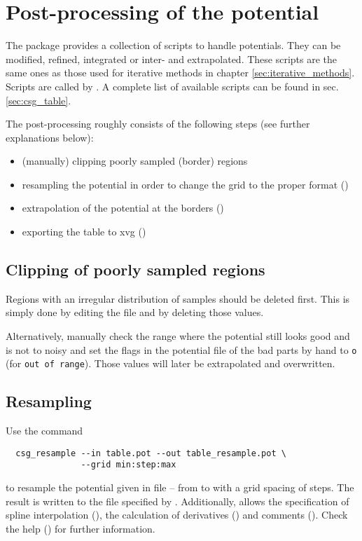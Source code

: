\section{Post-processing of the potential}
\label{sec:post_processing}
The \votca package provides a collection of scripts to handle potentials. They can be modified, refined, integrated or inter- and extrapolated. These scripts are the same ones as those used for iterative methods in chapter \ref{sec:iterative_methods}. Scripts are called by . A complete list of available scripts can be found in sec. \ref{sec:csg_table}.

The post-processing roughly consists of the following steps (see further explanations below):
\begin{itemize}
  \item (manually) clipping poorly sampled (border) regions
  \item resampling the potential in order to change the grid to the proper format ()
  \item extrapolation of the potential at the borders ()
  \item exporting the table to xvg ()
\end{itemize}

\subsection*{Clipping of poorly sampled regions}
Regions with an irregular distribution of samples should be deleted first. This is simply done by editing the  file and by deleting those values.

Alternatively, manually check the range where the potential still looks good and is not to noisy and set the flags in the potential file of the bad parts by hand to \texttt{o} (for \texttt{out of range}). Those values will later be extrapolated and overwritten.

\subsection*{Resampling}
Use the command
\begin{verbatim}
  csg_resample --in table.pot --out table_resample.pot \
               --grid min:step:max
\end{verbatim}
to resample the potential given in file -- from  to  with a grid spacing of  steps. The result is written to the file specified by . Additionally,  allows the specification of spline interpolation (), the calculation of derivatives () and comments (). Check the help () for further information.

